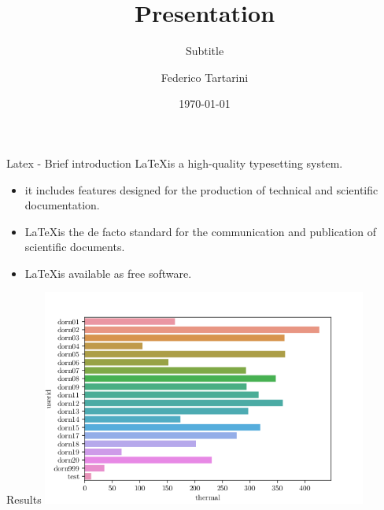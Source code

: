 \documentclass{beamer}
\title{Presentation}
\subtitle{Subtitle}
\date{\today}
\author{Federico Tartarini}
\institute{BEARS - Theme A}
\begin{document}
    \maketitle

    \begin{frame}{Latex - Brief introduction}
        \LaTeX is a high-quality typesetting system.
        \begin{itemize}
            \item it includes features designed for the production of technical and scientific documentation.
            \item \LaTeX is the de facto standard for the communication and publication of scientific documents.
            \item \LaTeX is available as free software.
        \end{itemize}
    \end{frame}

    \begin{frame}{Results}
        \centering
        \includegraphics[width=0.8\textwidth]{figures/bar-plot.png}
    \end{frame}
\end{document}
